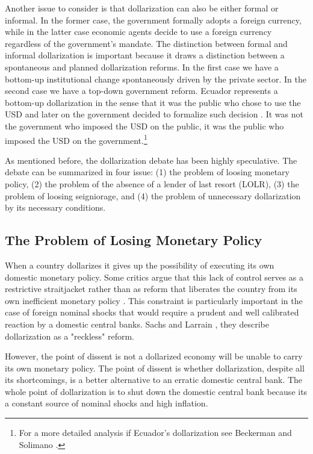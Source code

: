 \documentclass[12pt]{article}
\begin{document}
Another issue to consider is that dollarization can also be either formal or informal. In the former case, the government formally adopts a foreign currency, while in the latter case economic agents decide to use a foreign currency regardless of the government's mandate. The distinction between formal and informal dollarization is important because it draws a distinction between a spontaneous and planned dollarization reforms. In the first case we have a bottom-up institutional change spontaneously driven by the private sector. In the second case we have a top-down government reform. Ecuador represents a bottom-up dollarization in the sense that it was the public who chose to use the USD and later on the government decided to formalize such decision \parencite{White2014a}. It was not the government who imposed the USD on the public, it was the public who imposed the USD on the government.\footnote{For a more detailed analysis if Ecuador's dollarization see Beckerman and Solimano \parencite*{Beckerman2002}.}

As mentioned before, the dollarization debate has been highly speculative. The debate can be summarized in four issue: (1) the problem of loosing monetary policy, (2) the problem of the absence of a lender of last resort (LOLR), (3) the problem of loosing seigniorage, and (4) the problem of unnecessary dollarization by its necessary conditions.

\subsection{The Problem of Losing Monetary Policy}

When a country dollarizes it gives up the possibility of executing its own domestic monetary policy. Some critics argue that this lack of control serves as a restrictive straitjacket rather than as reform that liberates the country from its own inefficient monetary policy \parencite{Sachs1999}. This constraint is particularly important in the case of foreign nominal shocks that would require a prudent and well calibrated reaction by a domestic central banks. Sachs and Larrain \parencite[][p. 80]{Sachs1999}, they describe dollarization as a "reckless" reform.

However, the point of dissent is not a dollarized economy will be unable to carry its own monetary policy. The point of dissent is whether dollarization, despite all its shortcomings, is a better alternative to an erratic domestic central bank. The whole point of dollarization is to shut down the domestic central bank because its a constant source of nominal shocks and high inflation.
\end{document}
